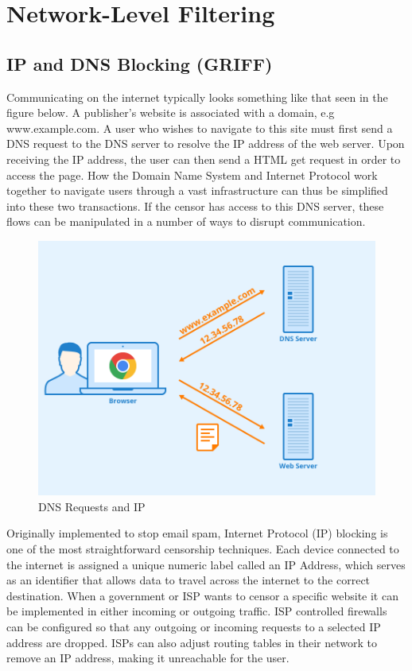 \section{Network-Level Filtering }
\subsection{IP and DNS Blocking (GRIFF)}
Communicating on the internet typically looks something like that seen in the figure below. A publisher's website is associated with a domain, e.g www.example.com. A user who wishes to navigate to this site must first send a DNS request to the DNS server to resolve the IP address of the web server. Upon receiving the IP address, the user can then send a HTML get request in order to access the page. How the Domain Name System and Internet Protocol work together to navigate users through a vast infrastructure can thus be simplified into these two transactions. If the censor has access to this DNS server, these flows can be manipulated in a number of ways to disrupt communication.

\begin{figure}
    \centering
    \includegraphics[width=0.5\linewidth]{State of the Art/DNS.png}
    \caption{DNS Requests and IP}
    \label{fig:enter-label}
\end{figure}
 

Originally implemented to stop email spam, Internet Protocol (IP) blocking is one of the most straightforward censorship techniques. Each device connected to the internet is assigned a unique numeric label called an IP Address, which serves as an identifier that allows data to travel across the internet to the correct destination. When a government or ISP wants to censor a specific website it can be implemented in either incoming or outgoing traffic. ISP controlled firewalls can be configured so that any outgoing or incoming requests to a selected IP address are dropped. ISPs can also adjust routing tables in their network to remove an IP address, making it unreachable for the user. 

